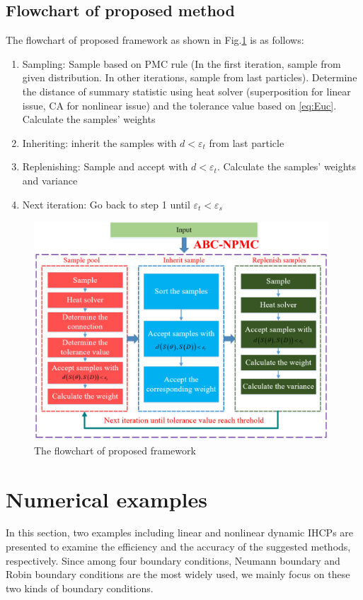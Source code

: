 \documentclass[review]{elsarticle}
\begin{document}
\subsection{Flowchart of proposed method}
The flowchart of proposed framework as shown in Fig.\ref{fig:flowchar} is as follows:
\begin{enumerate}[Step 1:]
    \item Sampling: Sample based on PMC rule (In the first iteration, sample from given distribution. In other iterations, sample from last particles). Determine the distance of summary statistic using heat solver (superposition for linear issue, CA for nonlinear issue) and the tolerance value based on  \ref{eq:Euc}. Calculate the samples' weights
    \item Inheriting: inherit the samples with $d<\varepsilon_t$ from last particle
    \item Replenishing: Sample and accept with $d<\varepsilon_t$. Calculate the samples' weights and variance
    \item Next iteration: Go back to step 1 until $\varepsilon_t<\varepsilon_s$
\end{enumerate}

\begin{figure}
    \centering
    \includegraphics[width=0.98\textwidth]{./fig/flowchart.png}
    \caption{The flowchart of proposed framework}
    \label{fig:flowchar}
\end{figure}

\section{Numerical examples}
In this section, two examples including linear and nonlinear dynamic IHCPs are presented to examine the efficiency and the accuracy of the suggested methods, respectively. Since among four boundary conditions, Neumann boundary and Robin boundary conditions are the most widely used, we mainly focus on these two kinds of boundary conditions.
\end{document}
